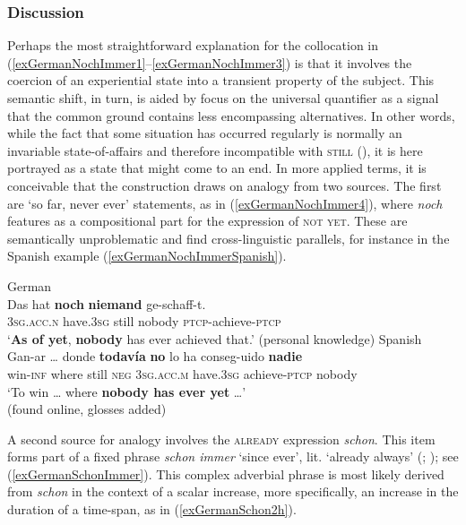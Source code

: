 \subsubsection{Discussion} 
Perhaps the most straightforward explanation for the collocation in (\ref{exGermanNochImmer1}–\ref{exGermanNochImmer3}) is that it involves the coercion of an experiential state into a transient property of the subject. This semantic shift, in turn, is aided by focus on the universal quantifier as a signal that the common ground contains less encompassing alternatives. In other words, while the fact that some situation has occurred regularly is normally an invariable state-of-affairs and therefore incompatible with \textsc{still} (), it is here portrayed as a state that might come to an end. In more applied terms, it is conceivable that the construction draws on analogy from two sources. The first are \lq so far, never ever\rq{ }statements, as in (\ref{exGermanNochImmer4}), where \textit{noch} features as a compositional part for the expression of \textsc{not yet}. These are semantically unproblematic and find cross-linguistic parallels, for instance in the Spanish example (\ref{exGermanNochImmerSpanish}).

\begin{exe}
	\ex German\label{exGermanNochImmer4}\\
	\gll Das hat \textbf{noch} \textbf{niemand} ge-schaff-t.\\
	3\textsc{sg}.\textsc{acc}.\textsc{n} have.3\textsc{sg} still nobody \textsc{ptcp}-achieve-\textsc{ptcp}\\
	\glt \lq \textbf{As of yet}, \textbf{nobody} has ever achieved that.\rq{ }(personal knowledge)
	\ex Spanish\label{exGermanNochImmerSpanish}\\
	\gll Gan-ar … donde \textbf{todavía} \textbf{no} lo ha conseg-uido \textbf{nadie}\\
	win-\textsc{inf} {} where still \textsc{neg} 3\textsc{sg}.\textsc{acc}.\textsc{m} have.3\textsc{sg} achieve-\textsc{ptcp} nobody\\
	\glt \lq To win … where \textbf{nobody has ever yet} …\rq{}
	\\(found online, glosses added)%
\end{exe}

A second source for analogy involves the \textsc{already} expression \textit{schon}. This item forms part of a fixed phrase \textit{schon immer} \lq since ever\rq{}, lit. \lq{}already always\rq{ }(\cite[203–204]{KoenigEtAl1993}; \cite[469]{MetrichFaucher2009}); see (\ref{exGermanSchonImmer}). This complex adverbial phrase is most likely derived from \textit{schon} in the context of a scalar increase, more specifically, an increase in the duration of a time-span, as in (\ref{exGermanSchon2h}).


